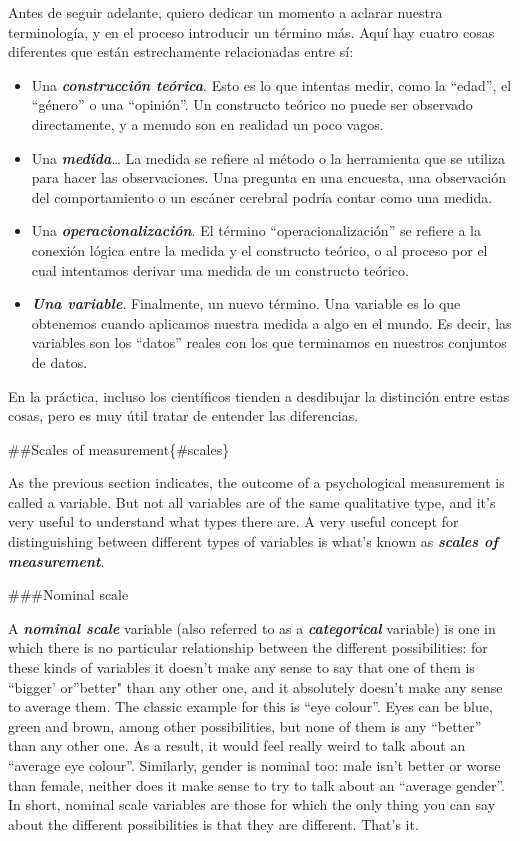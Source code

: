 \documentclass[]{book}
\providecommand{\tightlist}{%
  \setlength{\itemsep}{0pt}\setlength{\parskip}{0pt}}
\begin{document}
Antes de seguir adelante, quiero dedicar un momento a aclarar nuestra terminología, y en el proceso introducir un término más. Aquí hay cuatro cosas diferentes que están estrechamente relacionadas entre sí:

\begin{itemize}
\tightlist
\item
  Una \textbf{\emph{construcción teórica}}. Esto es lo que intentas medir, como la ``edad'', el ``género'' o una ``opinión''. Un constructo teórico no puede ser observado directamente, y a menudo son en realidad un poco vagos.
\item
  Una \textbf{\emph{medida}}\ldots{} La medida se refiere al método o la herramienta que se utiliza para hacer las observaciones. Una pregunta en una encuesta, una observación del comportamiento o un escáner cerebral podría contar como una medida.
\item
  Una \textbf{\emph{operacionalización}}. El término ``operacionalización'' se refiere a la conexión lógica entre la medida y el constructo teórico, o al proceso por el cual intentamos derivar una medida de un constructo teórico.
\item
  \textbf{\emph{Una variable}}. Finalmente, un nuevo término. Una variable es lo que obtenemos cuando aplicamos nuestra medida a algo en el mundo. Es decir, las variables son los ``datos'' reales con los que terminamos en nuestros conjuntos de datos.
\end{itemize}

En la práctica, incluso los científicos tienden a desdibujar la distinción entre estas cosas, pero es muy útil tratar de entender las diferencias.

\#\#Scales of measurement\{\#scales\}

As the previous section indicates, the outcome of a psychological measurement is called a variable. But not all variables are of the same qualitative type, and it's very useful to understand what types there are. A very useful concept for distinguishing between different types of variables is what's known as \textbf{\emph{scales of measurement}}.

\#\#\#Nominal scale

A \textbf{\emph{nominal scale}} variable (also referred to as a \textbf{\emph{categorical}} variable) is one in which there is no particular relationship between the different possibilities: for these kinds of variables it doesn't make any sense to say that one of them is ``bigger' or''better" than any other one, and it absolutely doesn't make any sense to average them. The classic example for this is ``eye colour''. Eyes can be blue, green and brown, among other possibilities, but none of them is any ``better'' than any other one. As a result, it would feel really weird to talk about an ``average eye colour''. Similarly, gender is nominal too: male isn't better or worse than female, neither does it make sense to try to talk about an ``average gender''. In short, nominal scale variables are those for which the only thing you can say about the different possibilities is that they are different. That's it.
\end{document}
